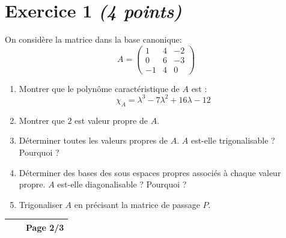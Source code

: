 \vspace{2em}

\section*{Exercice 1 \hfill \normalfont\itshape (4 points)}
On considère la matrice dans la base canonique:
$$A=\begin{pmatrix}
    1&4&-2\\
    0&6&-3\\
    -1&4&0
\end{pmatrix}$$
\begin{enumerate}
    \item Montrer que le polynôme caractéristique de $A$ est :
    $$\chi_A= \lambda^3-7\lambda^2+16\lambda -12$$
    \item Montrer que $2$ est valeur propre de $A$.
    \item Déterminer toutes les valeurs propres de $A$. $A$ est-elle trigonalisable ? Pourquoi ?
    \item Déterminer des bases des sous espaces propres associés à chaque valeur propre. $A$ est-elle diagonalisable ? Pourquoi ?
    \item Trigonaliser $A$ en précisant la matrice de passage $P$.
\end{enumerate}

\newpage

\begin{center}
    \renewcommand{\arraystretch}{1.5}
    \begin{tabular}{|>{\centering\arraybackslash}m{4cm}|>{\centering\arraybackslash}m{6cm}|>{\centering\arraybackslash}m{4cm}|}
        \hline
            \hspace{4cm}&\hspace{6cm} & \textbf{Page 2/3}\\
            \hline
    \end{tabular}
\end{center}

